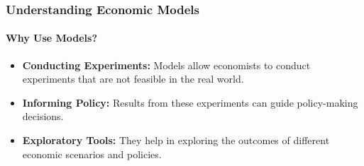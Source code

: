 \documentclass{beamer}
\begin{document}
    \begin{frame}
        \frametitle{Understanding Economic Models}
        \framesubtitle{Why Use Models?}
            \begin{itemize}
                \item \textbf{Conducting Experiments:} Models allow economists to conduct experiments that are not feasible in the real world.
                \item \textbf{Informing Policy:} Results from these experiments can guide policy-making decisions.
                \item \textbf{Exploratory Tools:} They help in exploring the outcomes of different economic scenarios and policies.
            \end{itemize}
        \end{frame}
        
\end{document}
